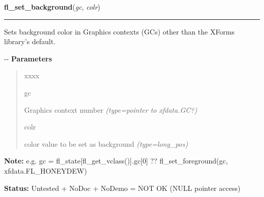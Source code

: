     \vspace{0.5ex}

\hspace{.8\funcindent}\begin{boxedminipage}{\funcwidth}

    \raggedright \textbf{fl\_set\_background}(\textit{gc}, \textit{colr})

    \vspace{-1.5ex}

    \rule{\textwidth}{0.5\fboxrule}
\setlength{\parskip}{2ex}

Sets background color in Graphics contexts (GCs) other than the XForms
library's default.

-{}-
\setlength{\parskip}{1ex}
      \textbf{Parameters}
      \vspace{-1ex}

      \begin{quote}
        \begin{Ventry}{xxxx}

          \item[gc]


Graphics context number
            {\it (type=pointer to xfdata.GC?)}

          \item[colr]


color value to be set as background
            {\it (type=long\_pos)}

        \end{Ventry}

      \end{quote}

\textbf{Note:} 
e.g. gc = fl\_state{[}fl\_get\_vclass(){]}.gc{[}0{]} ??
fl\_set\_foreground(gc, xfdata.FL\_HONEYDEW)


\textbf{Status:} 
Untested + NoDoc + NoDemo = NOT OK (NULL pointer access)


    \end{boxedminipage}

    \label{xformslib:flxbasic:fl_wincreate}

    \vspace{0.5ex}

